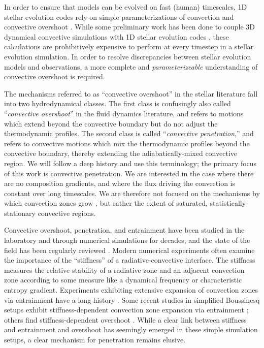 \documentclass[twocolumn]{aastex631}
\begin{document}
In order to ensure that models can be evolved on fast (human) timescales, 1D stellar evolution codes rely on simple parameterizations of convection \citep[e.g., mixing length theory,][]{bohm-vitense1958} and convective overshoot \citep{shaviv_salpeter_1973, maeder1975, herwig2000, paxton_etal_2011, paxton_etal_2013, paxton_etal_2018, paxton_etal_2019}.
While some preliminary work has been done to couple 3D dynamical convective simulations with 1D stellar evolution codes \citep{jorgensen_weiss_2019}, these calculations are prohibitively expensive to perform at every timestep in a stellar evolution simulation.
In order to resolve discrepancies between stellar evolution models and observations, a more complete and \emph{parameterizeable} understanding of convective overshoot is required.

The mechanisms referred to as ``convective overshoot'' in the stellar literature fall into two hydrodynamical classes.
The first class is confusingly also called ``\emph{convective overshoot}'' in the fluid dynamics literature, and refers to motions which extend beyond the convective boundary but do not adjust the thermodynamic profiles.
The second class is called ``\emph{convective penetration},'' and refers to convective motions which mix the thermodynamic profiles beyond the convective boundary, thereby extending the adiabatically-mixed convective region.
We will follow a deep history \citep{zahn1991, brummell_etal_2002, korre_etal_2019} and use this terminology; the primary focus of this work is convective penetration.
We are interested in the case where there are no composition gradients, and where the flux driving the convection is constant over long timescales.
We are therefore not focused on the mechanisms by which convection zones grow \citep[e.g., entrainment, ][]{meakin_arnett_2007, viallet_etal_2013, cristini_etal_2017, fuentes_cumming_2020, horst_etal_2021}, but rather the extent of saturated, statistically-stationary convective regions.

Convective overshoot, penetration, and entrainment have been studied in the laboratory and through numerical simulations for decades, and the state of the field has been regularly reviewed \citep[e.g.,][]{marcus_etal_1983, zahn1991, browning_etal_2004, rogers_etal_2006, viallet_etal_2015, korre_etal_2019}.
Modern numerical experiments often examine the importance of the ``stiffness'' of a radiative-convective interface.
The stiffness measures the relative stability of a radiative zone and an adjacent convection zone according to some measure like a dynamical frequency or characteristic entropy gradient.
Experiments exhibiting extensive expansion of convection zones via entrainment have a long history \citep[dating back to e.g.,][and this process is often confusingly called ``penetration'']{musman1968, deardorff_etal_1969, moore_weiss_1973}.
Some recent studies in simplified Boussinesq setups exhibit stiffness-dependent convection zone expansion via entrainment \citep{couston_etal_2017, toppaladoddi_wettlaufer_2018}; others find stiffness-dependent overshoot \citep{korre_etal_2019}.
While a clear link between stiffness and entrainment and overshoot has seemingly emerged in these simple simulation setups, a clear mechanism for penetration remains elusive.
\end{document}
